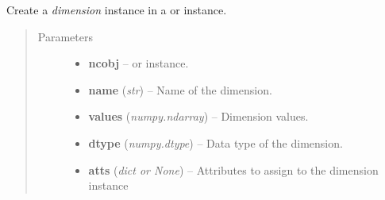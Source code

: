 \documentclass[letterpaper,10pt,english]{sphinxmanual}
\begin{document}
\begin{fulllineitems}
\label{docs/utilities:nctools.nc_create_dim}
Create a \emph{dimension} instance in a  or
 instance.
\begin{quote}\begin{description}
\item[{Parameters}] \leavevmode\begin{itemize}
\item {} 
\textbf{ncobj} --  or  instance.

\item {} 
\textbf{name} (\emph{str}) -- Name of the dimension.

\item {} 
\textbf{values} (\emph{numpy.ndarray}) -- Dimension values.

\item {} 
\textbf{dtype} (\emph{numpy.dtype}) -- Data type of the dimension.

\item {} 
\textbf{atts} (\emph{dict or None}) -- Attributes to assign to the dimension instance

\end{itemize}

\end{description}\end{quote}

\end{fulllineitems}


\end{document}
